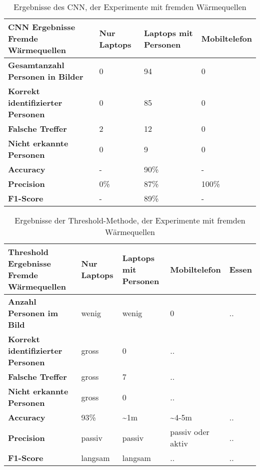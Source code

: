 \begin{table}[H]
	\begin{tabularx}{\textwidth}{|X|X|X|X|}
		\hline
		\textbf{\gls{CNN} Ergebnisse Fremde Wärmequellen} & \textbf{Nur Laptops} & \textbf{Laptops mit Personen} & \textbf{Mobiltelefon}\\
		\hline 
		\textbf{Gesamtanzahl Personen in Bilder} & 0 & 94 & 0\\
		\hline
		\textbf{Korrekt identifizierter Personen} & 0 & 85 & 0 \\
		\hline
		\textbf{Falsche Treffer} & 2 & 12 & 0 \\
		\hline
		\textbf{Nicht erkannte Personen} & 0 & 9 & 0\\
		\hline
		\textbf{Accuracy} & - & 90\% & -\\
		\hline  
		\textbf{Precision} & 0\% & 87\% & 100\%\\
		\hline
		\textbf{F1-Score} & - & 89\% & - \\
		\hline
	\end{tabularx}
	\caption{Ergebnisse des \gls{CNN}, der Experimente mit fremden Wärmequellen}
	\label{tbl:heatSources}
\end{table}

\begin{table}[H]
	\begin{tabularx}{\textwidth}{|X|X|X|X|X|}
		\hline
		\textbf{Threshold Ergebnisse Fremde Wärmequellen} & \textbf{Nur Laptops} & \textbf{Laptops mit Personen} & \textbf{Mobiltelefon} & \textbf{Essen}\\
		\hline 
		\textbf{Anzahl Personen im Bild} & wenig & wenig & 0 & ..\\
		\hline
		\textbf{Korrekt identifizierter Personen} & gross & 0 &..\\
		\hline
		\textbf{Falsche Treffer} & gross & 7 &..\\
		\hline
		\textbf{Nicht erkannte Personen} & gross & 0 &..\\
		\hline
		\textbf{Accuracy} & 93\% & \textasciitilde 1m & \textasciitilde 4-5m & ..\\
		\hline  
		\textbf{Precision} & passiv & passiv & passiv oder aktiv & ..\\
		\hline
		\textbf{F1-Score} & langsam & langsam & .. & ..\\
		\hline
	\end{tabularx}
	\caption{Ergebnisse der Threshold-Methode, der Experimente mit fremden Wärmequellen}
	\label{tbl:threshHeatSources}
\end{table}

